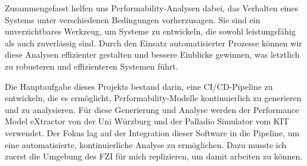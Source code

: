 Zusammengefasst helfen uns Performability-Analysen dabei, das Verhalten eines Systems unter verschiedenen Bedingungen vorherzusagen. Sie sind ein unverzichtbares Werkzeug, um Systeme zu entwickeln, die sowohl leistungsfähig als auch zuverlässig sind. Durch den Einsatz automatisierter Prozesse können wir diese Analysen effizienter gestalten und bessere Einblicke gewinnen, was letztlich zu robusteren und effizienteren Systemen führt.

Die Hauptaufgabe dieses Projekts bestand darin, eine CI/CD-Pipeline zu entwickeln, die es ermöglicht, Performability-Modelle kontinuierlich zu generieren und zu analysieren. Für diese Generierung und Analyse werden der Performance Model eXtractor von der Uni Würzburg \cite{pmx} und der Palladio Simulator vom KIT \cite{palladio} verwendet. Der Fokus lag auf der Integration dieser Software in die Pipeline, um eine automatisierte, kontinuierliche Analyse zu ermöglichen. Dazu musste ich zuerst die Umgebung des FZI für mich replizieren, um damit arbeiten zu können. 

